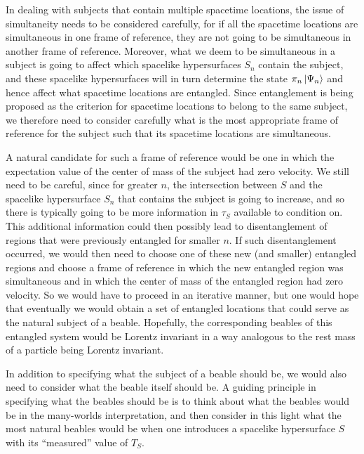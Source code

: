 In dealing with subjects that contain multiple spacetime locations, the issue of simultaneity needs to be considered carefully, for if all the spacetime locations are simultaneous in one frame of reference, they are not going to be simultaneous in another frame of reference. Moreover, what we deem to be simultaneous in a subject is going to affect which spacelike hypersurfaces $S_n$ contain the subject, and these spacelike hypersurfaces will in turn determine the state $\pi_n\ket{\Psi_n}$ and hence affect what spacetime locations are entangled. Since entanglement is being proposed as the criterion for spacetime locations to belong to the same subject, we therefore need to consider carefully what is the most appropriate frame of reference for the subject such that its spacetime locations are simultaneous. 

A natural candidate for such a frame of reference would be one in which the expectation value of the center of mass of the subject had zero velocity. We still need to be careful, since for greater $n$, the intersection between $S$ and the spacelike hypersurface $S_n$ that contains the subject is going to increase, and so there is typically going to be more  information in $\tau_S$ available to condition on. This additional information could then possibly lead to disentanglement of regions that were previously entangled for  smaller $n$. If such disentanglement occurred, we would then need to choose one of these new (and smaller) entangled regions and choose a frame of reference in which the new entangled region was simultaneous and in which the center of mass of the entangled region had zero velocity. So we would have to proceed in an iterative manner, but one would hope that eventually we would obtain a set of entangled locations that could serve as the natural subject of a beable. Hopefully, the corresponding beables of this entangled system would be Lorentz invariant in a way analogous to the rest mass of a particle being Lorentz invariant.

In addition to specifying what the subject of a beable should be, we would also need to consider what the beable itself should be. A guiding principle in specifying what the beables should be is to think about what the beables would be in the many-worlds interpretation, and then consider in this light what the most natural beables would be when one introduces a spacelike hypersurface $S$ with its ``measured'' value of $T_S$. 

